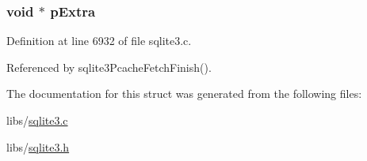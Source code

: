 \subsubsection[{p\+Extra}]{\setlength{\rightskip}{0pt plus 5cm}void $\ast$ p\+Extra}\label{structsqlite3__pcache__page_acde03a4be601792bcfef6718ebe0f9ad}


Definition at line 6932 of file sqlite3.\+c.



Referenced by sqlite3\+Pcache\+Fetch\+Finish().



The documentation for this struct was generated from the following files\+:\begin{DoxyCompactItemize}
\item 
libs/\hyperlink{sqlite3_8c}{sqlite3.\+c}\item 
libs/\hyperlink{sqlite3_8h}{sqlite3.\+h}\end{DoxyCompactItemize}
